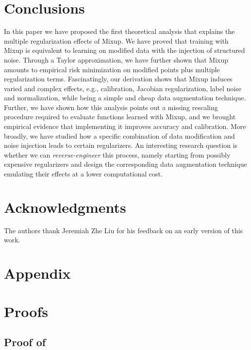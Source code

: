 \documentclass[twoside,11pt]{article}
\begin{document}
\section{Conclusions}
In this paper we have proposed the first theoretical analysis that explains the multiple regularization effects of Mixup. We have proved that training with Mixup is equivalent to learning on modified data with the injection of structured noise.
Through a Taylor approximation, we have further shown that 
Mixup
amounts to
empirical risk minimization on modified points plus multiple regularization terms. Fascinatingly,
our derivation shows that Mixup induces varied and complex effects, e.g., calibration, Jacobian regularization, label noise and normalization, 
while being a simple and cheap data augmentation technique.
Further, we have shown how this analysis points out a missing rescaling procedure required to evaluate functions learned with
Mixup, and we brought empirical evidence that implementing it improves accuracy and calibration.
More broadly, we have studied how a specific combination of data modification and noise injection leads to certain regularizers. An interesting research question is whether we can \textit{reverse-engineer} this process, namely starting from possibly expensive regularizers and design the corresponding data augmentation technique emulating their effects at a lower computational cost.

 
\section*{\bf Acknowledgments\ \ }
{The authors thank Jeremiah Zhe Liu for his feedback on an early version of this work.}



 \newpage
\appendix
\section*{Appendix}
\section{Proofs}\label{sec:annex}

\subsection{Proof of }
\end{document}
